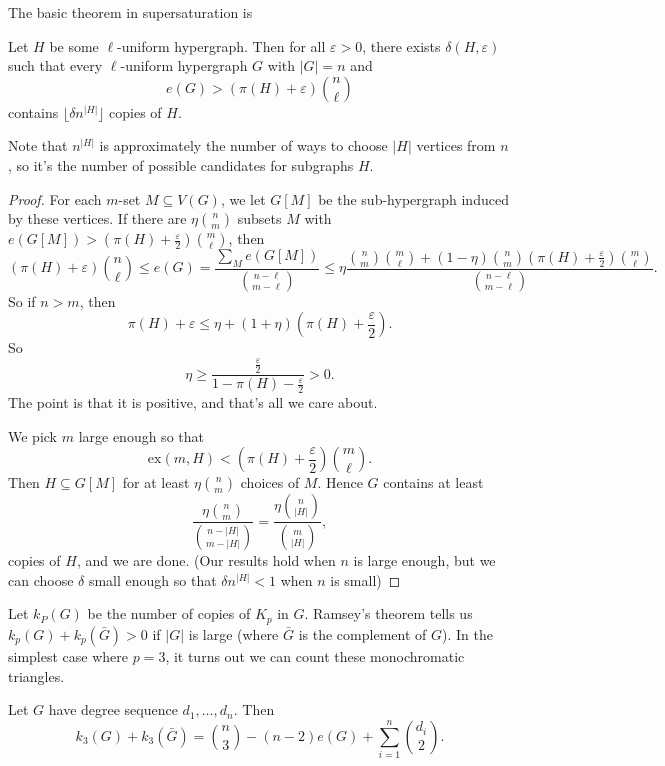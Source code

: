 \documentclass[a4paper]{article}
\renewcommand\ex{\mathrm{ex}}
\begin{document}
The basic theorem in supersaturation is
\begin{thm}
  Let $H$ be some $\ell$-uniform hypergraph. Then for all $\varepsilon > 0$, there exists $\delta(H, \varepsilon)$ such that every $\ell$-uniform hypergraph $G$ with $|G| = n$ and
  \[
    e(G) > (\pi(H) + \varepsilon) \binom{n}{\ell}
  \]
  contains $\lfloor \delta n^{|H|}\rfloor$ copies of $H$.
\end{thm}
Note that $n^{|H|}$ is approximately the number of ways to choose $|H|$ vertices from $n$, so it's the number of possible candidates for subgraphs $H$.

\begin{proof}
  For each $m$-set $M \subseteq V(G)$, we let $G[M]$ be the sub-hypergraph induced by these vertices. If there are $\eta \binom{n}{m}$ subsets $M$ with $e(G[M]) > \left(\pi(H) + \frac{\varepsilon}{2}\right) \binom{m}{\ell}$, then
  \[
    \left(\pi(H) + \varepsilon\right) \binom{n}{\ell} \leq e(G) = \frac{\sum_M e(G[M])}{\binom{n - \ell}{m - \ell}} \leq \eta \frac{\binom{n}{m} \binom{m}{\ell} + (1 - \eta) \binom{n}{m} \left(\pi(H) + \frac{\varepsilon}{2}\right) \binom{m}{\ell}}{\binom{n - \ell}{m - \ell}}.
  \]
  So if $n > m$, then
  \[
    \pi(H) + \varepsilon \leq \eta + (1 + \eta) \left(\pi(H) + \frac{\varepsilon}{2}\right).
  \]
  So
  \[
    \eta \geq \frac{\frac{\varepsilon}{2}}{1 - \pi(H) - \frac{\varepsilon}{2}} > 0.
  \]
  The point is that it is positive, and that's all we care about.

  We pick $m$ large enough so that
  \[
    \ex(m, H) < \left(\pi(H) + \frac{\varepsilon}{2}\right) \binom{m}{\ell}.
  \]
  Then $H \subseteq G[M]$ for at least $\eta \binom{n}{m}$ choices of $M$. Hence $G$ contains at least
  \[
    \frac{\eta\binom{n}{m}}{\binom{n - |H|}{m - |H|}} = \frac{\eta\binom{n}{|H|}}{\binom{m}{|H|}},
  \]
  copies of $H$, and we are done. (Our results hold when $n$ is large enough, but we can choose $\delta$ small enough so that $\delta n^{|H|} < 1$ when $n$ is small)
\end{proof}

Let $k_P(G)$ be the number of copies of $K_p$ in $G$. Ramsey's theorem tells us $k_p(G) + k_p(\bar{G}) > 0$ if $|G|$ is large (where $\bar{G}$ is the complement of $G$). In the simplest case where $p = 3$, it turns out we can count these monochromatic triangles.
\begin{thm}[Lorden, 1961]
  Let $G$ have degree sequence $d_1, \ldots, d_n$. Then
  \[
    k_3(G) + k_3(\bar{G}) = \binom{n}{3} - (n - 2) e(G) + \sum_{i = 1}^n \binom{d_i}{2}.
  \]
\end{thm}
\end{document}
